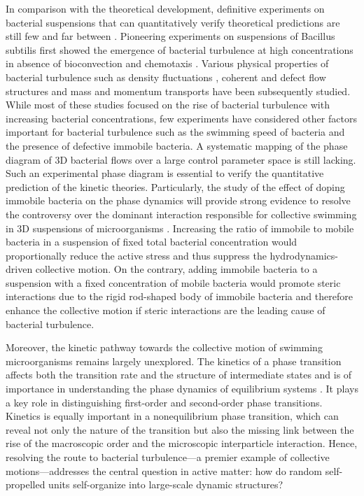 In comparison with the theoretical development, definitive experiments on bacterial suspensions that can quantitatively verify theoretical predictions are still few and far between \cite{Koch2011, Saintillan2015}.
Pioneering experiments on suspensions of Bacillus subtilis first showed the emergence of bacterial turbulence at high concentrations in absence of bioconvection and chemotaxis \cite{Cisneros2011, Dombrowski2004, Cisneros2007, Sokolov2007, Sokolov2009}.
Various physical properties of bacterial turbulence such as density fluctuations \cite{Sokolov2009}, coherent and defect flow structures \cite{Sokolov2012, Ryan2013, Guo2018, Li2019} and mass and momentum transports \cite{Peng2016, Lopez2015, Liu2019, Yang2016} have been subsequently studied.
While most of these studies focused on the rise of bacterial turbulence with increasing bacterial concentrations, few experiments have considered other factors important for bacterial turbulence such as the swimming speed of bacteria \cite{Sokolov2012, Ryan2013} and the presence of defective immobile bacteria. A systematic mapping of the phase diagram of 3D bacterial flows over a large control parameter space is still lacking. Such an experimental phase diagram is essential to verify the quantitative prediction of the kinetic theories. Particularly, the study of the effect of doping immobile bacteria on the phase dynamics will provide strong evidence to resolve the controversy over the dominant interaction responsible for collective swimming in 3D suspensions of microorganisms \cite{Aranson2007, Ezhilan2013}. Increasing the ratio of immobile to mobile bacteria in a suspension of fixed total bacterial concentration would proportionally reduce the active stress and thus suppress the hydrodynamics-driven collective motion. On
the contrary, adding immobile bacteria to a suspension with a fixed concentration of mobile bacteria would promote steric interactions due to the rigid rod-shaped body of immobile bacteria and therefore enhance the collective motion if steric interactions are the leading cause of bacterial turbulence.

Moreover, the kinetic pathway towards the collective motion of swimming microorganisms remains largely unexplored. The kinetics of a phase transition affects both the transition rate and the structure of intermediate states and is of importance in understanding the phase dynamics of equilibrium systems \cite{Peng2015}. It plays a key role in distinguishing first-order and second-order phase transitions. Kinetics is equally important in a nonequilibrium phase transition, which can reveal not only the nature of the transition but also the missing link between the rise of the macroscopic order and the microscopic interparticle interaction. Hence, resolving the route to bacterial turbulence---a premier example of collective motions---addresses the central question in active matter: how do random self-propelled units self-organize into large-scale dynamic structures?

